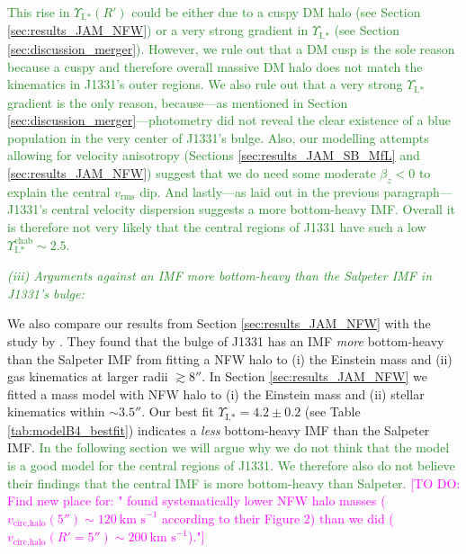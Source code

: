 \documentclass[useAMS,usenatbib]{mnras}
\newcommand{\Wilma}[1]{\textcolor{Magenta}{#1}}
\newcommand{\NEW}[1]{\textcolor{ForestGreen}{#1}}
\begin{document}
\NEW{This rise in $\Upsilon_\text{I,*}(R')$ could be either due to a cuspy DM halo (see Section \ref{sec:results_JAM_NFW}) or a very strong gradient in $\Upsilon_\text{I,*}$ (see Section \ref{sec:discussion_merger}). However, we rule out that a DM cusp is the sole reason because a cuspy and therefore overall massive DM halo does not match the kinematics in J1331's outer regions. We also rule out that a very strong $\Upsilon_\text{I,*}$ gradient is the only reason, because---as mentioned in Section \ref{sec:discussion_merger}---photometry did not reveal the clear existence of a blue population in the very center of J1331's bulge. Also, our modelling attempts allowing for velocity anisotropy (Sections \ref{sec:results_JAM_SB_MfL} and \ref{sec:results_JAM_NFW}) suggest that we do need some moderate $\beta_z<0$ to explain the central $v_\text{rms}$ dip. And lastly---as laid out in the previous paragraph---J1331's central velocity dispersion suggests a more bottom-heavy IMF. Overall it is therefore not very likely that the central regions of J1331 have such a low $\Upsilon_\text{I,*}^\text{chab} \sim 2.5$.}

\NEW{\emph{(iii) Arguments against an IMF more bottom-heavy than the Salpeter IMF in J1331's bulge:}} 

We also compare our results from Section \ref{sec:results_JAM_NFW} with the study by \citet{SWELLSV}. They found that the bulge of J1331 has an IMF \emph{more} bottom-heavy than the Salpeter IMF from fitting a NFW halo to (i) the Einstein mass and (ii) gas kinematics at larger radii $\gtrsim 8''$. In Section \ref{sec:results_JAM_NFW} we fitted a mass model with NFW halo to (i) the Einstein mass and (ii) stellar kinematics within $\sim 3.5''$. Our best fit $\Upsilon_\text{I,*} = 4.2 \pm 0.2$ (see Table \ref{tab:modelB4_bestfit}) indicates a \emph{less} bottom-heavy IMF than the Salpeter IMF. \NEW{In the following section we will argue why we do not think that the \cite{SWELLSV} model is a good model for the central regions of J1331. We therefore also do not believe their findings that the central IMF is more bottom-heavy than Salpeter.} \Wilma{[TO DO: Find new place for: "\cite{SWELLSV} found systematically lower NFW halo masses ($v_\text{circ,halo}(5'') \sim 120~\text{km s}^{-1}$ according to their Figure 2) than we did ($v_\text{circ,halo}(R'=5'') \sim 200~\text{km s}^{-1}$)."]}
\end{document}
